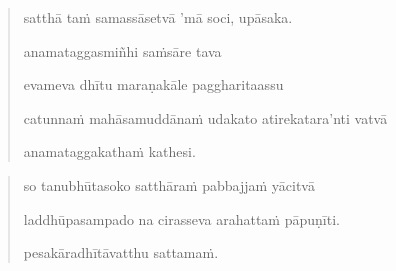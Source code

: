 \documentclass[11pt,oneside]{memoir}
\begin{document}
\clearpage

\begin{quote}
satthā taṁ samassāsetvā 'mā soci, upāsaka.

anamataggasmiñhi saṁsāre tava

evameva dhītu maraṇakāle paggharitaassu

catunnaṁ mahāsamuddānaṁ udakato atirekatara'nti vatvā

anamataggakathaṁ kathesi.
\end{quote}


\clearpage

\begin{quote}
so tanubhūtasoko satthāraṁ pabbajjaṁ yācitvā

laddhūpasampado na cirasseva arahattaṁ pāpuṇīti.

pesakāradhītāvatthu sattamaṁ.
\end{quote}


\clearpage
\end{document}
